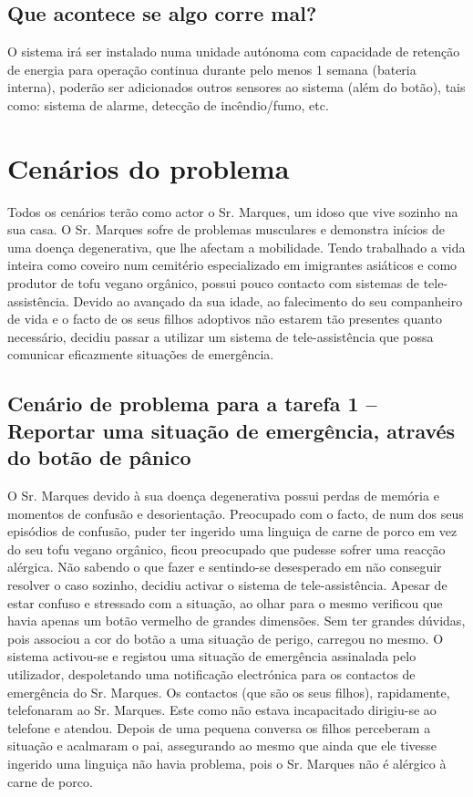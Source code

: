\subsection{Que acontece se algo corre mal?}
O sistema irá ser instalado numa unidade autónoma com capacidade de retenção de energia para operação continua durante pelo menos 1 semana (bateria interna), poderão ser adicionados outros sensores ao sistema (além do botão), tais como: sistema de alarme, detecção de incêndio/fumo, etc.

\section{Cenários do problema}

Todos os cenários terão como actor o Sr. Marques, um idoso que vive sozinho na sua casa. O Sr. Marques sofre de problemas musculares e demonstra inícios de uma doença degenerativa, que lhe afectam a mobilidade. Tendo trabalhado a vida inteira como coveiro num cemitério especializado em imigrantes asiáticos e como produtor de tofu vegano orgânico, possui pouco contacto com sistemas de tele-assistência. Devido ao avançado da sua idade, ao falecimento do seu companheiro de vida e o facto de os seus filhos adoptivos não estarem tão presentes quanto necessário, decidiu passar a utilizar um sistema de tele-assistência que possa comunicar eficazmente situações de emergência.

\subsection{Cenário de problema para a tarefa 1 – Reportar uma situação de emergência, através do botão de pânico}

O Sr. Marques devido à sua doença degenerativa possui perdas de memória e momentos de confusão e desorientação. Preocupado com o facto, de num dos seus episódios de confusão, puder ter ingerido uma linguiça de carne de porco em vez do seu tofu vegano orgânico, ficou preocupado que pudesse sofrer uma reacção alérgica. Não sabendo o que fazer e sentindo-se desesperado em não conseguir resolver o caso sozinho, decidiu activar o sistema de tele-assistência. Apesar de estar confuso e stressado com a situação, ao olhar para o mesmo verificou que havia apenas um botão vermelho de grandes dimensões. Sem ter grandes dúvidas, pois associou a cor do botão a uma situação de perigo, carregou no mesmo.
O sistema activou-se e registou uma situação de emergência assinalada pelo utilizador, despoletando uma notificação electrónica para os contactos de emergência do Sr. Marques.
Os contactos (que são os seus filhos), rapidamente, telefonaram ao Sr. Marques. Este como não estava incapacitado dirigiu-se ao telefone e atendou. Depois de uma pequena conversa os filhos perceberam a situação e acalmaram o pai, assegurando ao mesmo que ainda que ele tivesse ingerido uma linguiça não havia problema, pois o Sr. Marques não é alérgico à carne de porco.


